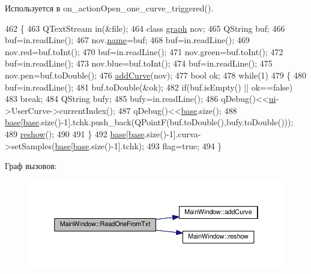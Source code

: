 Используется в on\+\_\+action\+Open\+\_\+one\+\_\+curve\+\_\+triggered().


\begin{DoxyCode}
462 \{
463     QTextStream in(&file);
464     \textcolor{keyword}{class }\hyperlink{classgraph}{graph} nov;
465     QString buf;
466     buf=in.readLine();
467     nov.\hyperlink{classgraph_abfbbdbd09b20d6ef147ee966b1325595}{name}=buf;
468     buf=in.readLine();
469     nov.red=buf.toInt();
470     buf=in.readLine();
471     nov.green=buf.toInt();
472     buf=in.readLine();
473     nov.blue=buf.toInt();
474     buf=in.readLine();
475     nov.pen=buf.toDouble();
476     \hyperlink{class_main_window_aa5c0998b1192bfab3ff83b02c42b2c67}{addCurve}(nov);
477     \textcolor{keywordtype}{bool} ok;
478     \textcolor{keywordflow}{while}(1)
479     \{
480         buf=in.readLine();
481         buf.toDouble(&ok);
482         \textcolor{keywordflow}{if}(buf.isEmpty() || ok==\textcolor{keyword}{false})
483             \textcolor{keywordflow}{break};
484         QString bufy;
485         bufy=in.readLine();
486         qDebug()<<\hyperlink{class_main_window_a35466a70ed47252a0191168126a352a5}{ui}->UserCurve->currentIndex();
487         qDebug()<<\hyperlink{class_main_window_a3413d4508f4981518b1b8ebf3b29121e}{base}.size();
488         \hyperlink{class_main_window_a3413d4508f4981518b1b8ebf3b29121e}{base}[\hyperlink{class_main_window_a3413d4508f4981518b1b8ebf3b29121e}{base}.size()-1].tchk.push\_back(QPointF(buf.toDouble(),bufy.toDouble()));
489         \hyperlink{class_main_window_a24985964bdf5f59467dcc99749e06bdd}{reshow}();
490 
491     \}
492     \hyperlink{class_main_window_a3413d4508f4981518b1b8ebf3b29121e}{base}[\hyperlink{class_main_window_a3413d4508f4981518b1b8ebf3b29121e}{base}.size()-1].curva->setSamples(\hyperlink{class_main_window_a3413d4508f4981518b1b8ebf3b29121e}{base}[\hyperlink{class_main_window_a3413d4508f4981518b1b8ebf3b29121e}{base}.size()-1].tchk);
493     flag=\textcolor{keyword}{true};
494 \}
\end{DoxyCode}


Граф вызовов\+:\nopagebreak
\begin{figure}[H]
\begin{center}
\leavevmode
\includegraphics[width=350pt]{class_main_window_a50c6d26a5751b97d502334de0c43fcef_cgraph}
\end{center}
\end{figure}




